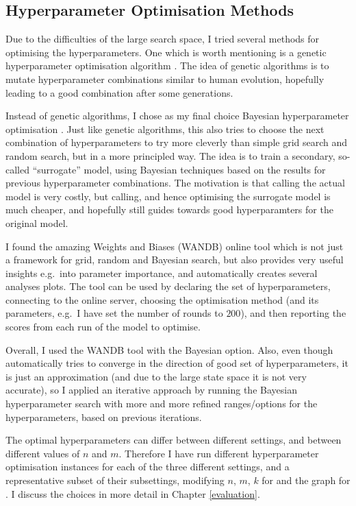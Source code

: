 \subsection{Hyperparameter Optimisation Methods}

Due to the difficulties of the large search space, I tried several methods for optimising the hyperparameters. One which is worth mentioning is a genetic hyperparameter optimisation algorithm \cite{wicaksono2018genetichyper}. The idea of genetic algorithms is to mutate hyperparameter combinations similar to human evolution, hopefully leading to a good combination after some generations.


Instead of genetic algorithms, I chose as my final choice Bayesian hyperparameter optimisation \cite{eggensperger2013bayesianhyper}. Just like genetic algorithms, this also tries to choose the next combination of hyperparameters to try more cleverly than simple grid search and random search, but in a more principled way. The idea is to train a secondary, so-called ``surrogate'' model, using Bayesian techniques based on the results for previous hyperparameter combinations. The motivation is that calling the actual model is very costly, but calling, and hence optimising the surrogate model is much cheaper, and hopefully still guides towards good hyperparamters for the original model.


I found the amazing Weights and Biases (WANDB) online tool \cite{biewald2020wandb} which is not just a framework for grid, random and Bayesian search, but also provides very useful insights e.g.\ into parameter importance, and automatically creates several analyses plots. The tool can be used by declaring the set of hyperparameters, connecting to the online server, choosing the optimisation method (and its parameters, e.g.\ I have set the number of rounds to $200$), and then reporting the scores from each run of the model to optimise.


Overall, I used the WANDB tool with the Bayesian option. Also, even though automatically tries to converge in the direction of good set of hyperparameters, it is just an approximation (and due to the large state space it is not very accurate), so I applied an iterative approach by running the Bayesian hyperparameter search with more and more refined ranges/options for the hyperparameters, based on previous iterations.


The optimal hyperparameters can differ between different settings, and between different values of $n$ and $m$. Therefore I have run different hyperparameter optimisation instances for each of the three different settings, and a representative subset of their subsettings, modifying $n$, $m$, $k$ for \KThinning and the graph for \GraphicalTwoChoice. I discuss the choices in more detail in Chapter \ref{evaluation}.


